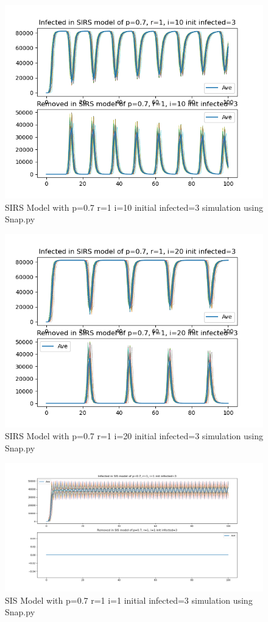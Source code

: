 \documentclass{subfile}
\begin{document}
  \begin{figure}
  \includegraphics[scale=0.8]{sirsp07r1i10s3}
  \caption[SIRS p=0.7,r=1,i=10,init infected=3]{SIRS Model with p=0.7 r=1 i=10 initial infected=3 simulation using Snap.py}
  \end{figure}
  \begin{figure}
  \includegraphics[scale=0.8]{sirsp07r1i20s3}
  \caption[SIRS p=0.7,r=1,i=20,init infected=3]{SIRS Model with p=0.7 r=1 i=20 initial infected=3 simulation using Snap.py}
  \end{figure}
  \begin{figure}
  \includegraphics[scale=0.8]{sisp07r1i1s3}
  \caption[SIS p=0.7,r=1,i=1,init infected=3]{SIS Model with p=0.7 r=1 i=1 initial infected=3 simulation using Snap.py}
  \end{figure}
\end{document}
